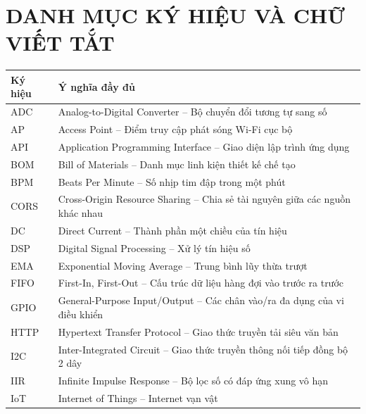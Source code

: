 {
\renewcommand{\baselinestretch}{1.1}
\setlength{\parskip}{2pt}

\section*{DANH MỤC KÝ HIỆU VÀ CHỮ VIẾT TẮT}

\begin{center}
\renewcommand{\arraystretch}{1.2}
\begin{tabular}{|l|l|}
\hline
\textbf{Ký hiệu} & \textbf{Ý nghĩa đầy đủ} \\ \hline
ADC & \parbox[t]{11cm}{\raggedright Analog-to-Digital Converter -- Bộ chuyển đổi tương tự sang số} \\ \hline
AP & \parbox[t]{11cm}{\raggedright Access Point -- Điểm truy cập phát sóng Wi-Fi cục bộ} \\ \hline
API & \parbox[t]{11cm}{\raggedright Application Programming Interface -- Giao diện lập trình ứng dụng} \\ \hline
BOM & \parbox[t]{11cm}{\raggedright Bill of Materials -- Danh mục linh kiện thiết kế chế tạo} \\ \hline
BPM & \parbox[t]{11cm}{\raggedright Beats Per Minute -- Số nhịp tim đập trong một phút} \\ \hline
CORS & \parbox[t]{11cm}{\raggedright Cross-Origin Resource Sharing -- Chia sẻ tài nguyên giữa các nguồn khác nhau} \\ \hline
DC & \parbox[t]{11cm}{\raggedright Direct Current -- Thành phần một chiều của tín hiệu} \\ \hline
DSP & \parbox[t]{11cm}{\raggedright Digital Signal Processing -- Xử lý tín hiệu số} \\ \hline
EMA & \parbox[t]{11cm}{\raggedright Exponential Moving Average -- Trung bình lũy thừa trượt} \\ \hline
FIFO & \parbox[t]{11cm}{\raggedright First-In, First-Out -- Cấu trúc dữ liệu hàng đợi vào trước ra trước} \\ \hline
GPIO & \parbox[t]{11cm}{\raggedright General-Purpose Input/Output -- Các chân vào/ra đa dụng của vi điều khiển} \\ \hline
HTTP & \parbox[t]{11cm}{\raggedright Hypertext Transfer Protocol -- Giao thức truyền tải siêu văn bản} \\ \hline
I2C & \parbox[t]{11cm}{\raggedright Inter-Integrated Circuit -- Giao thức truyền thông nối tiếp đồng bộ 2 dây} \\ \hline
IIR & \parbox[t]{11cm}{\raggedright Infinite Impulse Response -- Bộ lọc số có đáp ứng xung vô hạn} \\ \hline
IoT & \parbox[t]{11cm}{\raggedright Internet of Things -- Internet vạn vật} \\ \hline
\end{tabular}
\end{center}

}
